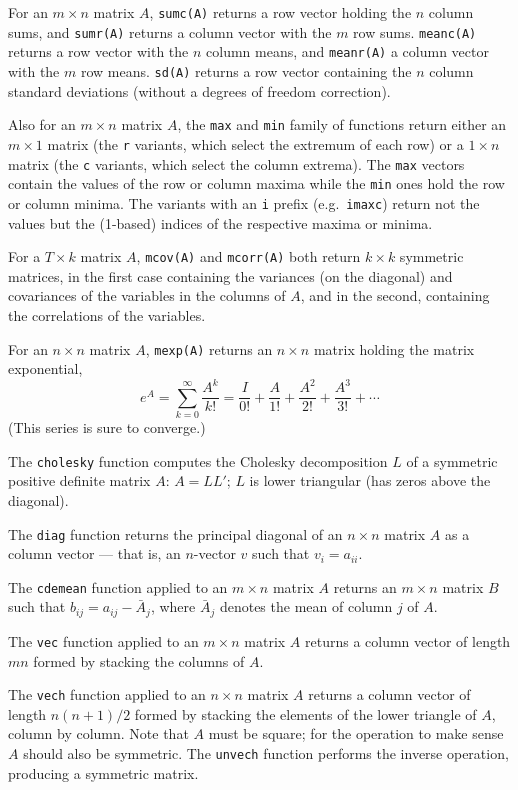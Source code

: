 For an $m \times n$ matrix $A$, \texttt{sumc(A)} returns a row vector
holding the $n$ column sums, and \texttt{sumr(A)} returns a column
vector with the $m$ row sums.  \texttt{meanc(A)} returns a row vector
with the $n$ column means, and \texttt{meanr(A)} a column vector with
the $m$ row means.  \texttt{sd(A)} returns a row vector containing
the $n$ column standard deviations (without a degrees of freedom
correction).

Also for an $m \times n$ matrix $A$, the \texttt{max} and \texttt{min}
family of functions return either an $m \times 1$ matrix (the
\texttt{r} variants, which select the extremum of each row) or a $1
\times n$ matrix (the \texttt{c} variants, which select the column
extrema).  The \texttt{max} vectors contain the values of the row or
column maxima while the \texttt{min} ones hold the row or column
minima.  The variants with an \texttt{i} prefix (e.g.\ \texttt{imaxc})
return not the values but the (1-based) indices of the respective
maxima or minima.

For a $T \times k$ matrix $A$, \texttt{mcov(A)} and \texttt{mcorr(A)}
both return $k \times k$ symmetric matrices, in the first case
containing the variances (on the diagonal) and covariances of the
variables in the columns of $A$, and in the second, containing the
correlations of the variables.

For an $n \times n$ matrix $A$, \texttt{mexp(A)} returns an $n \times
n$ matrix holding the matrix exponential,
\[
e^A = \sum_{k=0}^{\infty} \frac{A^k}{k!} = \frac{I}{0!} + \frac{A}{1!}
 + \frac{A^2}{2!} + \frac{A^3}{3!} + \cdots
\]
(This series is sure to converge.)

The \texttt{cholesky} function computes the Cholesky decomposition $L$
of a symmetric positive definite matrix $A$: $A = LL'$; $L$ is lower
triangular (has zeros above the diagonal).  

The \texttt{diag} function returns the principal diagonal of an
$n\times n$ matrix $A$ as a column vector --- that is, an
$n$-vector $v$ such that $v_i = a_{ii}$.

The \texttt{cdemean} function applied to an $m \times n$ matrix $A$
returns an $m \times n$ matrix $B$ such that $b_{ij} = a_{ij} -
\bar{A}_j$, where $\bar{A}_j$ denotes the mean of column $j$ of $A$.  

The \texttt{vec} function applied to an $m \times n$ matrix $A$
returns a column vector of length $mn$ formed by stacking the columns
of $A$.  

The \texttt{vech} function applied to an $n \times n$ matrix $A$
returns a column vector of length $n(n+1)/2$ formed by stacking the
elements of the lower triangle of $A$, column by column.  Note that
$A$ must be square; for the operation to make sense $A$ should also
be symmetric.  The \texttt{unvech} function performs the inverse
operation, producing a symmetric matrix.


